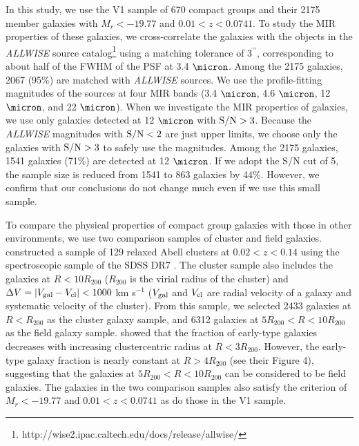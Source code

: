 \documentclass[12pt,preprint,apj]{emulateapj}
\newcommand{\rvir}{R_{200}}
\begin{document}
In this study, we use the V1 sample of 670 compact groups and 
their 2175 member galaxies with $M_r < -19.77$ and $0.01<z<0.0741$. 
To study the MIR properties of these galaxies, we cross-correlate the galaxies 
with the objects in the \textit{ALLWISE} source 
catalog\footnote{http://wise2.ipac.caltech.edu/docs/release/allwise/}
using a matching tolerance of 3$^{\prime\prime}$, corresponding to 
about half of the FWHM of the PSF at 3.4 $\micron$.
Among the 2175 galaxies, 2067 (95\%) are matched with \textit{ALLWISE} sources. 
We use the profile-fitting magnitudes of the sources at four MIR bands 
(3.4 $\micron$, 4.6 $\micron$, 12 $\micron$, and 22 $\micron$).
When we investigate the MIR properties of galaxies, we use only galaxies 
detected at 12 $\micron$ with ${\rm S/N}>3$. 
Because the \textit{ALLWISE} magnitudes with ${\rm S/N}<2$ are just upper limits, 
we choose only the galaxies with ${\rm S/N}>3$ to safely use the magnitudes.
Among the 2175 galaxies, 1541 galaxies (71\%) are detected at 12 $\micron$. 
If we adopt the S/N cut of 5, the sample size is reduced from 1541 to 863 galaxies
by 44\%. However, we confirm that our conclusions do not change much
even if we use this small sample.

To compare the physical properties of compact group galaxies with those 
in other environments, we use two comparison samples of cluster and field galaxies. 
\citet{hwang+12a} constructed a sample of 129 relaxed Abell clusters at 
$0.02<z<0.14$ using the spectroscopic sample of the SDSS DR7 
\citep{abazajian+09}. 
The cluster sample also includes the galaxies at $R<10\rvir$ 
($\rvir$ is the virial radius of the cluster) and 
$\Delta V = | V_{\rm gal} - V_{\rm cl} | < 1000$ km s$^{-1}$ 
($V_{\rm gal}$ and $V_{\rm cl}$ are radial velocity of a galaxy and 
systematic velocity of the cluster).
From this sample, we selected 2433 galaxies at $R<\rvir$ 
as the cluster galaxy sample, and 6312 galaxies at $5\rvir<R<10\rvir$ 
as the field galaxy sample. 
\citet{park+09} showed that the fraction of early-type galaxies 
decreases with increasing clustercentric radius at $R<3\rvir$. 
However, the early-type galaxy fraction is nearly constant at $R>4\rvir$ (see their Figure 4), suggesting that the galaxies at $5\rvir<R<10\rvir$ can be considered to be field galaxies.
The galaxies in the two comparison samples also satisfy the criterion of 
$M_r<-19.77$ and $0.01<z<0.0741$ as do those in the V1 sample.
\end{document}
